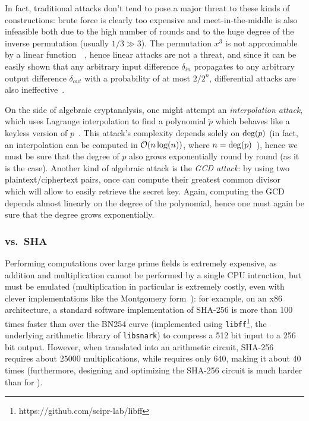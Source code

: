 In fact, traditional attacks don't tend to pose a major threat to these kinds of constructions:
brute force is clearly too expensive and meet-in-the-middle is also infeasible both due to the high 
number of rounds and to the huge degree of the inverse permutation (usually \(1/3 \gg 3\)).
The permutation \(x^3\) is not approximable by a linear function~~\cite{AbdelraheemABL2012}, 
hence linear attacks are not a threat, and since it can be easily shown that any arbitrary input 
difference \(\delta_{in} \) propagates to any arbitrary output difference \(\delta_{out} \) with a 
probability of at most \({2}/{2^n}\), differential attacks are also ineffective~\cite{Nyberg1994}.

On the side of algebraic cryptanalysis, one might attempt an \emph{interpolation attack}, which 
uses Lagrange interpolation to find a polynomial \(\tilde{p}\) which behaves like a keyless version 
of \(p\)~\cite{JakobsenK1997}.
This attack's complexity depends solely on \(\call{\deg}{p}\) (in fact, an interpolation can be 
computed in \(\BigO{n\call{\log}{n}}\), where \(n = \call{\deg}{p}\)~\cite{Stoss1985}), hence we 
must be sure that the degree of \(p\) also grows exponentially round by round (as it is the case).
Another kind of algebraic attack is the \emph{GCD attack}: by using two plaintext/ciphertext pairs,
once can compute their greatest common divisor which will allow to easily retrieve the secret key.
Again, computing the GCD depends almost linearly on the degree of the polynomial, hence one must 
again be sure that the degree grows exponentially.

\subsubsection*{\Mimc{} vs.\ SHA}
Performing computations over large prime fields is extremely expensive, as addition and 
multiplication cannot be performed by a single CPU intruction, but must be emulated (multiplication 
in particular is extremely costly, even with clever implementations like the Montgomery 
form~\cite{Montgomery1985}): for example, on an x86 architecture, a standard software 
implementation of SHA-256 is more than \(100\) times faster than \Mimc{} over the BN254 curve 
(implemented using \texttt{libff}\footnote{https://github.com/scipr-lab/libff}, the underlying 
arithmetic library of \texttt{libsnark}) to compress a 512 bit input to a 256 bit output.
However, when translated into an arithmetic circuit, SHA-256 requires about \(25000\) 
multiplications, while \Mimc{} requires only \(640\), making it about \(40\) times (furthermore, 
designing and optimizing the SHA-256 circuit is much harder than for \Mimc{}). 

